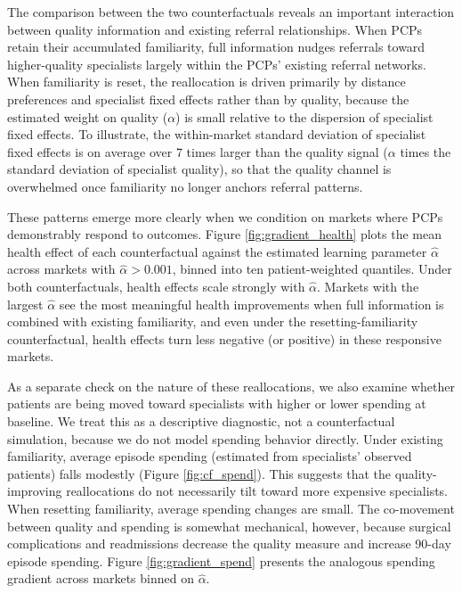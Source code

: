 \documentclass[12pt]{article}
\begin{document}
The comparison between the two counterfactuals reveals an important interaction between quality information and existing referral relationships. When PCPs retain their accumulated familiarity, full information nudges referrals toward higher-quality specialists largely within the PCPs' existing referral networks. When familiarity is reset, the reallocation is driven primarily by distance preferences and specialist fixed effects rather than by quality, because the estimated weight on quality ($\alpha$) is small relative to the dispersion of specialist fixed effects. To illustrate, the within-market standard deviation of specialist fixed effects is on average over 7 times larger than the quality signal ($\alpha$ times the standard deviation of specialist quality), so that the quality channel is overwhelmed once familiarity no longer anchors referral patterns.

These patterns emerge more clearly when we condition on markets where PCPs demonstrably respond to outcomes. Figure \ref{fig:gradient_health} plots the mean health effect of each counterfactual against the estimated learning parameter $\hat\alpha$ across markets with $\hat\alpha > 0.001$, binned into ten patient-weighted quantiles. Under both counterfactuals, health effects scale strongly with $\hat\alpha$. Markets with the largest $\hat\alpha$ see the most meaningful health improvements when full information is combined with existing familiarity, and even under the resetting-familiarity counterfactual, health effects turn less negative (or positive) in these responsive markets.

As a separate check on the nature of these reallocations, we also examine whether patients are being moved toward specialists with higher or lower spending at baseline. We treat this as a descriptive diagnostic, not a counterfactual simulation, because we do not model spending behavior directly. Under existing familiarity, average episode spending (estimated from specialists' observed patients) falls modestly (Figure \ref{fig:cf_spend}). This suggests that the quality-improving reallocations do not necessarily tilt toward more expensive specialists. When resetting familiarity, average spending changes are small. The co-movement between quality and spending is somewhat mechanical, however, because surgical complications and readmissions decrease the quality measure and increase 90-day episode spending. Figure \ref{fig:gradient_spend} presents the analogous spending gradient across markets binned on $\hat\alpha$.
\end{document}
